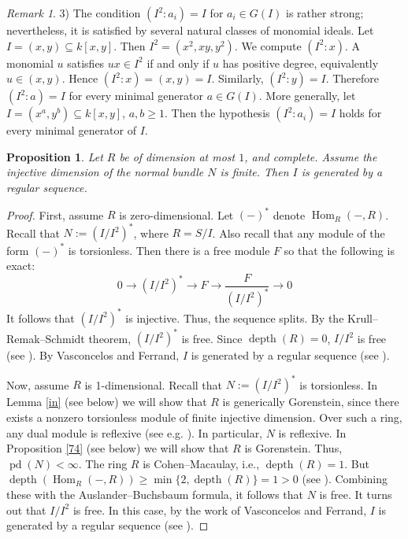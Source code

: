 \documentclass[10. pt,a4paper]{amsart}
\newtheorem{proposition}[theorem]{Proposition}
\theoremstyle{definition}
\theoremstyle{remark}
\newtheorem{remark}[theorem]{Remark}\newtheorem{fact}[theorem]{Fact}
\newcommand{\pd}{\operatorname{pd}}
\newcommand{\Hom}{\operatorname{Hom}}
\newcommand{\depth}{\operatorname{depth}}
\newcommand{\lo}{\longrightarrow}
\begin{document}
\begin{remark}
3) The condition \( (I^2 : a_i)=I \) for  \( a_i\in G(I) \) is rather strong; nevertheless, it is satisfied by several natural classes of monomial ideals. 	Let
	\(
	I=(x,y)\subseteq k[x,y].
	\)
	Then
	\(
	I^2=(x^2,xy,y^2).
	\)
	We compute
	\(
	(I^2:x)
.
	\)
	A monomial $u$ satisfies $ux\in I^2$ if and only if $u$ has positive degree, equivalently $u\in (x,y)$. Hence
	\(
	(I^2:x)=(x,y)=I.
	\)
	Similarly,
	\(
	(I^2:y)=I.
	\)
	Therefore
	\(
	(I^2:a)=I
	\)
	for every minimal generator $a\in G(I)$.  More generally,
let
	\(
	I=(x^a,y^b)\subseteq k[x,y]\),
	\(a,b\ge 1.
	\)
	Then
the hypothesis
	\(
	(I^2:a_i)=I
	\)
	holds for every minimal generator of $I$.
\end{remark}

\begin{proposition}\label{511}		Let $R$ be of dimension at most $1$, and complete. Assume the injective dimension of the normal bundle $N$ is finite. Then $I$ is generated by a regular sequence.  
\end{proposition}

\begin{proof}
First, assume $R$ is zero-dimensional.	Let $(-)^\ast$ denote $\Hom_R(-,R)$. Recall that $N := (I/I^2)^\ast$, where $R = S/I$. Also recall that any module of the form $(-)^\ast$ is torsionless.
Then
there is a free module $F$ so that the following is exact:
$$0\lo (I/I^{2})^\ast\lo F\lo  \frac{F}{ (I/I^{2})^\ast}  \lo 0$$
It follows that $(I/I^{2})^\ast$ is injective. Thus, the sequence
splits.  By the Krull--Remak--Schmidt theorem,
$(I/I^{2})^\ast$ is free. Since $\depth(R)=0$,
$I/I^{2}$ is free (see \cite{ram}). By
Vasconcelos and Ferrand, $I$ is generated by a regular sequence (see \cite{v}).




Now, assume $R$ is 1-dimensional. Recall that $N := (I/I^2)^\ast$  is torsionless. In Lemma \ref{in} (see below) we will show that $R$ is generically Gorenstein, since there exists a nonzero torsionless module of finite injective dimension. Over such a ring, any dual module is reflexive (see e.g. \cite[Fact 5.14]{moh2}). In particular, $N$ is reflexive. In {Proposition} \ref{74} (see below) we will show that $R$ is Gorenstein. Thus, $\pd(N) < \infty$. The ring $R$ is Cohen–Macaulay, i.e., $\depth(R) = 1$. But $\depth(\Hom_R(-,R)) \geq \min\{2,\depth(R)\} = 1 > 0$ (see \cite[1.4.19]{BH}). Combining these with the Auslander–Buchsbaum formula, it follows that $N$ is free. It turns out that $I/I^2$ is free. In this case, by the work of Vasconcelos and Ferrand, $I$ is generated by a regular sequence (see \cite{v}).
\end{proof}
\end{document}
